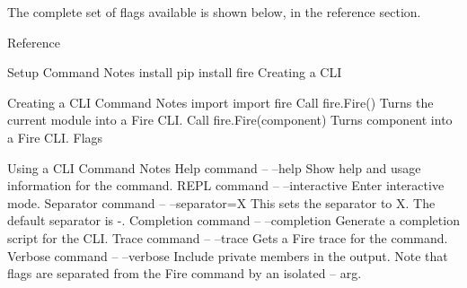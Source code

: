 \documentclass{article}
\begin{document}
The complete set of flags available is shown below, in the reference section.

Reference

Setup	Command	Notes
install	pip install fire	
Creating a CLI

Creating a CLI	Command	Notes
import	import fire	
Call	fire.Fire()	Turns the current module into a Fire CLI.
Call	fire.Fire(component)	Turns component into a Fire CLI.
Flags

Using a CLI	Command	Notes
Help	command -- --help	Show help and usage information for the command.
REPL	command -- --interactive	Enter interactive mode.
Separator	command -- --separator=X	This sets the separator to X. The default separator is -.
Completion	command -- --completion	Generate a completion script for the CLI.
Trace	command -- --trace	Gets a Fire trace for the command.
Verbose	command -- --verbose	Include private members in the output.
Note that flags are separated from the Fire command by an isolated -- arg.
\end{document}
